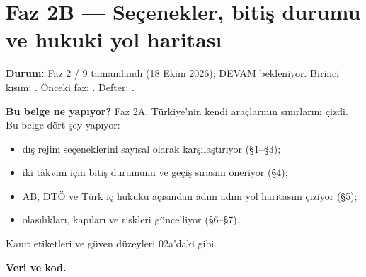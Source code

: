 \hypertarget{02b_secenekler_hukuk}{%
\chapter{Faz 2B --- Seçenekler, bitiş durumu ve hukuki yol haritası}\label{02b_secenekler_hukuk}}

\textbf{Durum:} Faz 2 / 9 tamamlandı (18 Ekim 2026); DEVAM bekleniyor. Birinci kısım: . Önceki faz: . Defter: .

\textbf{Bu belge ne yapıyor?} Faz 2A, Türkiye'nin kendi araçlarının sınırlarını çizdi. Bu belge dört şey yapıyor:

\begin{itemize}
\tightlist
\item
  dış rejim seçeneklerini sayısal olarak karşılaştırıyor (§1--§3);
\item
  iki takvim için bitiş durumunu ve geçiş sırasını öneriyor (§4);
\item
  AB, DTÖ ve Türk iç hukuku açısından adım adım yol haritasını çiziyor (§5);
\item
  olasılıkları, kapıları ve riskleri güncelliyor (§6--§7).
\end{itemize}

Kanıt etiketleri ve güven düzeyleri 02a'daki gibi.

\textbf{Veri ve kod.}

\begingroup\gbtablo\small

